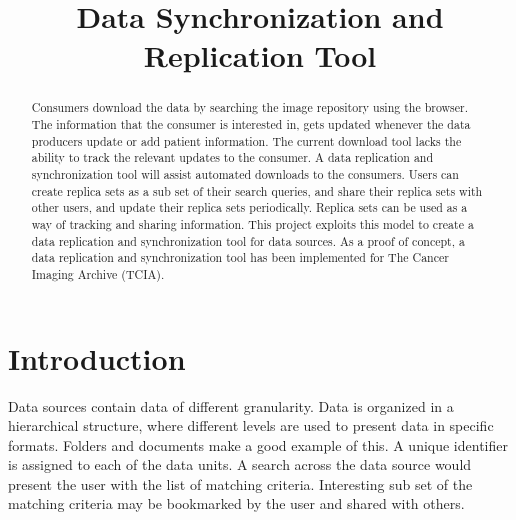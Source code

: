 \documentclass[conference]{IEEEtran}
\begin{document}
\title{Data Synchronization and Replication Tool}

\author{
\and
{}
}
\maketitle

\begin{abstract}
Consumers download the data by searching the image repository using the browser. The information that the consumer is interested in, gets updated whenever the data producers update or add patient information. The current download tool lacks the ability to track the relevant updates to the consumer. A data replication and synchronization tool will assist automated downloads to the consumers. Users can create replica sets as a sub set of their search queries, and share their replica sets with other users, and update their replica sets periodically. Replica sets can be used as a way of tracking and sharing information. This project exploits this model to create a data replication and synchronization tool for data sources. As a proof of concept, a data replication and synchronization tool has been implemented for The Cancer Imaging Archive (TCIA).
\end{abstract}

\IEEEpeerreviewmaketitle

\section{Introduction}
Data sources contain data of different granularity. Data is organized in a hierarchical structure, where different levels are used to present data in specific formats. Folders and documents make a good example of this. A unique identifier is assigned to each of the data units. A search across the data source would present the user with the list of matching criteria. Interesting sub set of the matching criteria may be bookmarked by the user and shared with others. 
\end{document}
